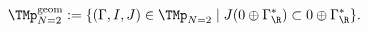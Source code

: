 \begin{equation}
\label{eq:Mgeom}
  \TMp_{N=2}^{\mathrm{geom}} := \{ (\Gamma, I, J) \in \TMp_{N=2} \mid
  J(0 \oplus \Gamma_\R^*) \subset 0 \oplus \Gamma_\R^* \}.
\end{equation}

